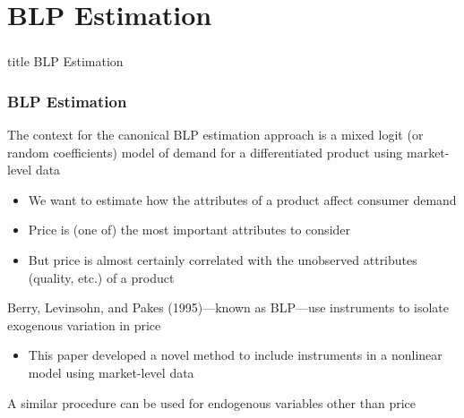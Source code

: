 \documentclass{beamer}
\begin{document}
\section{BLP Estimation}
\label{blp}
\begin{frame}\frametitle{}
    \vfill
    \centering
    \begin{beamercolorbox}[center]{title}
        \Large BLP Estimation
    \end{beamercolorbox}
    \vfill
\end{frame}

\begin{frame}\frametitle{BLP Estimation}
    The context for the canonical BLP estimation approach is a mixed logit (or random coefficients) model of demand for a differentiated product using market-level data
    \begin{itemize}
        \item We want to estimate how the attributes of a product affect consumer demand
        \item Price is (one of) the most important attributes to consider
        \item But price is almost certainly correlated with the unobserved attributes (quality, etc.) of a product
    \end{itemize}
    \vspace{2ex}
    Berry, Levinsohn, and Pakes (1995)---known as BLP---use instruments to isolate exogenous variation in price
    \begin{itemize}
        \item This paper developed a novel method to include instruments in a nonlinear model using market-level data
    \end{itemize}
    \vspace{2ex}
    A similar procedure can be used for endogenous variables other than price
\end{frame}
\end{document}

